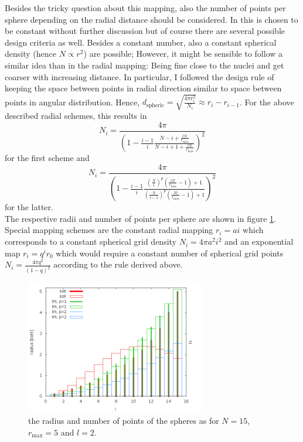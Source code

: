 Besides the tricky question about this mapping, also the number of points per sphere depending on the radial distance should be considered. 
In \cite{Son_Chu0} this is chosen to be constant without further discussion but of course there are several possible design criteria as well.
Besides a constant number, also a constant spherical density (hence $N\propto r^2$) are possible; However, it might be sensible to follow a similar idea than in the radial mapping: Being fine close to the nuclei and get coarser with increasing distance.
In particular, I followed the design rule of keeping the space between points in radial direction similar to space between points in angular distribution.
Hence, $d_\text{spheric}=\sqrt{\frac{4\pi r_i^2}{N_i}}\approx r_i-r_{i-1}$.
For the above described radial schemes, this results in 
\[
N_i= \frac{4\pi}{ \left(1-\frac{i-1 }{i}\frac{N-i+\frac{lN}{r_\text{max}}}{N-i+1+\frac{lN}{r_\text{max}}}\right)^2 }
\]
for the first scheme and 
\[
N_i= \frac{4\pi}{\left(1-\frac{i-1 }{i}\frac{ (\frac{N}{i})^p \left(\frac{lN}{r_\text{max}}-1\right)+1}{ (\frac{N}{i-1})^p\left( \frac{Nl}{r_\text{max}} -1 \right) +1 } \right)^2 }
\]
for the latter.\\
The respective radii and number of points per sphere are shown in figure \ref{fig:maps}.\\
Special mapping schemes are the constant radial mapping $r_i=a i$ which corresponds to a constant spherical grid density $N_i=4\pi a^2 i^2$ and an exponential map $r_i=q^i r_0$ which would require a constant number of spherical grid points $N_i=\frac{4\pi q^2}{(1-q)^2}$ according to the rule derived above.

\begin{figure}
\includegraphics[width=0.7\textwidth]{Figures/RadialMap}
\caption{the radius and number of points of the spheres as for $N=15$, $r_\text{max}=5$ and $l=2$.}
\label{fig:maps}
\end{figure}

